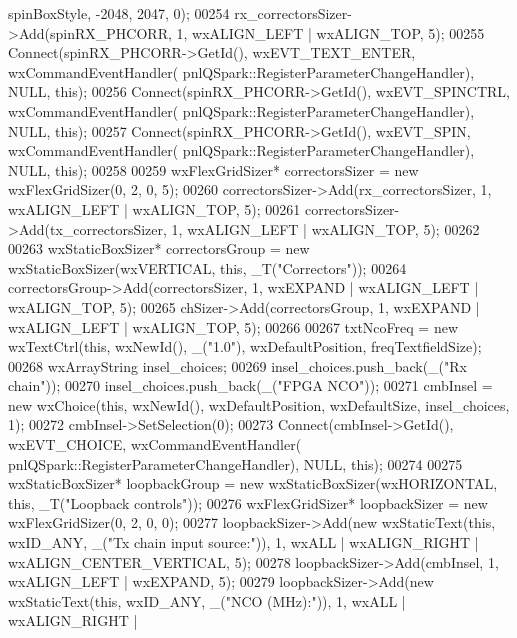 \begin{DoxyCode}
      spinBoxStyle, -2048, 2047, 0);
00254     rx\_correctorsSizer->Add(spinRX_PHCORR, 1, wxALIGN\_LEFT | wxALIGN\_TOP, 5);
00255     Connect(spinRX_PHCORR->GetId(), wxEVT\_TEXT\_ENTER, wxCommandEventHandler(
      pnlQSpark::RegisterParameterChangeHandler), NULL, \textcolor{keyword}{this});
00256     Connect(spinRX_PHCORR->GetId(), wxEVT\_SPINCTRL, wxCommandEventHandler(
      pnlQSpark::RegisterParameterChangeHandler), NULL, \textcolor{keyword}{this});
00257     Connect(spinRX_PHCORR->GetId(), wxEVT\_SPIN, wxCommandEventHandler(
      pnlQSpark::RegisterParameterChangeHandler), NULL, \textcolor{keyword}{this});
00258 
00259     wxFlexGridSizer* correctorsSizer = \textcolor{keyword}{new} wxFlexGridSizer(0, 2, 0, 5);
00260     correctorsSizer->Add(rx\_correctorsSizer, 1, wxALIGN\_LEFT | wxALIGN\_TOP, 5);
00261     correctorsSizer->Add(tx\_correctorsSizer, 1, wxALIGN\_LEFT | wxALIGN\_TOP, 5);
00262 
00263     wxStaticBoxSizer* correctorsGroup = \textcolor{keyword}{new} wxStaticBoxSizer(wxVERTICAL, \textcolor{keyword}{this}, \_T(\textcolor{stringliteral}{"Correctors"}));
00264     correctorsGroup->Add(correctorsSizer, 1, wxEXPAND | wxALIGN\_LEFT | wxALIGN\_TOP, 5);
00265     chSizer->Add(correctorsGroup, 1, wxEXPAND | wxALIGN\_LEFT | wxALIGN\_TOP, 5);
00266 
00267     txtNcoFreq = \textcolor{keyword}{new} wxTextCtrl(\textcolor{keyword}{this}, wxNewId(), \_(\textcolor{stringliteral}{"1.0"}), wxDefaultPosition, freqTextfieldSize);
00268     wxArrayString insel\_choices;
00269     insel\_choices.push\_back(\_(\textcolor{stringliteral}{"Rx chain"}));
00270     insel\_choices.push\_back(\_(\textcolor{stringliteral}{"FPGA NCO"}));
00271     cmbInsel = \textcolor{keyword}{new} wxChoice(\textcolor{keyword}{this}, wxNewId(), wxDefaultPosition, wxDefaultSize, insel\_choices, 1);
00272     cmbInsel->SetSelection(0);
00273     Connect(cmbInsel->GetId(), wxEVT\_CHOICE, wxCommandEventHandler(
      pnlQSpark::RegisterParameterChangeHandler), NULL, \textcolor{keyword}{this});
00274 
00275     wxStaticBoxSizer* loopbackGroup = \textcolor{keyword}{new} wxStaticBoxSizer(wxHORIZONTAL, \textcolor{keyword}{this}, \_T(\textcolor{stringliteral}{"Loopback controls"}));
00276     wxFlexGridSizer* loopbackSizer = \textcolor{keyword}{new} wxFlexGridSizer(0, 2, 0, 0);
00277     loopbackSizer->Add(\textcolor{keyword}{new} wxStaticText(\textcolor{keyword}{this}, wxID\_ANY, \_(\textcolor{stringliteral}{"Tx chain input source:"})), 1, wxALL | 
      wxALIGN\_RIGHT | wxALIGN\_CENTER\_VERTICAL, 5);
00278     loopbackSizer->Add(cmbInsel, 1, wxALIGN\_LEFT | wxEXPAND, 5);
00279     loopbackSizer->Add(\textcolor{keyword}{new} wxStaticText(\textcolor{keyword}{this}, wxID\_ANY, \_(\textcolor{stringliteral}{"NCO (MHz):"})), 1, wxALL | wxALIGN\_RIGHT | 

\end{DoxyCode}

